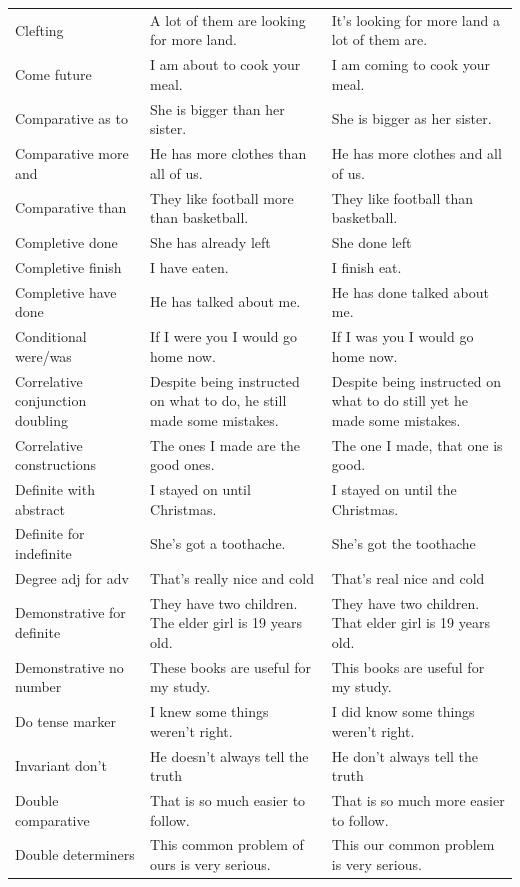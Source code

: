 \begin{longtable}{
  >{\raggedright\arraybackslash}p{3.2cm}
  >{\raggedright\arraybackslash}p{4.8cm}
  >{\raggedright\arraybackslash}p{4.8cm}
}
Clefting & A lot of them are looking for more land. & It's looking for more land a lot of them are. \\
Come future & I am about to cook your meal. & I am coming to cook your meal. \\
Comparative as to & She is bigger than her sister. & She is bigger as her sister. \\
Comparative more and & He has more clothes than all of us. & He has more clothes and all of us. \\
Comparative than & They like football more than basketball. & They like football than basketball. \\
Completive done & She has already left & She done left \\
Completive finish & I have eaten. & I finish eat. \\
Completive have done & He has talked about me. & He has done talked about me. \\
Conditional were/was & If I were you I would go home now. & If I was you I would go home now. \\
Correlative conjunction doubling & Despite being instructed on what to do, he still made some mistakes. & Despite being instructed on what to do still yet he made some mistakes. \\
Correlative constructions & The ones I made are the good ones. & The one I made, that one is good. \\
Definite with abstract & I stayed on until Christmas. & I stayed on until the Christmas. \\
Definite for indefinite & She's got a toothache. & She's got the toothache \\
Degree adj for adv & That's really nice and cold & That's real nice and cold \\
Demonstrative for definite & They have two children. The elder girl is 19 years old. & They have two children. That elder girl is 19 years old. \\
Demonstrative no number & These books are useful for my study. & This books are useful for my study. \\
Do tense marker & I knew some things weren't right. & I did know some things weren't right. \\
Invariant don't & He doesn't always tell the truth & He don't always tell the truth \\
Double comparative & That is so much easier to follow. & That is so much more easier to follow. \\
Double determiners & This common problem of ours is very serious. & This our common problem is very serious. \\

\end{longtable}
